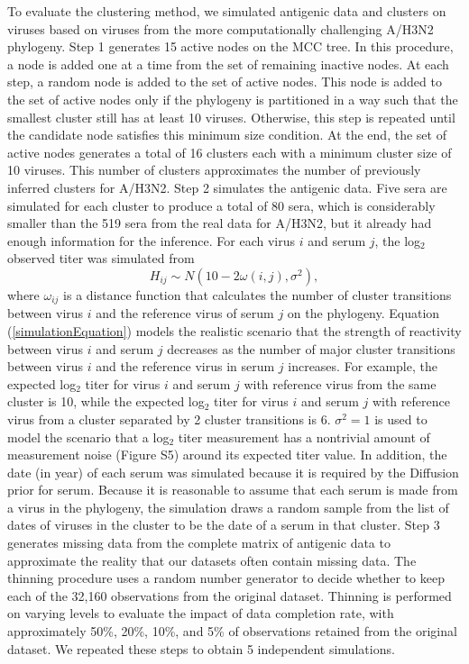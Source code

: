 \documentclass[11pt,oneside,letterpaper]{article}
\begin{document}

To evaluate the clustering method, we simulated antigenic data and clusters on viruses based on viruses from the more computationally challenging A/H3N2 phylogeny.
Step 1 generates 15 active nodes on the MCC tree. 
In this procedure, a node is added one at a time from the set of remaining inactive nodes.
At each step, a random node is added to the set of active nodes.
This node is added to the set of active nodes only if the phylogeny is partitioned in a way such that the smallest cluster still has at least 10 viruses. 
Otherwise, this step is repeated until the candidate node satisfies this minimum size condition.
At the end, the set of active nodes generates a total of 16 clusters each with a minimum cluster size of 10 viruses.
This number of clusters approximates the number of previously inferred clusters for A/H3N2\cite{smith_mapping_2004}. 
Step 2 simulates the antigenic data.
Five sera are simulated for each cluster to produce a total of 80 sera, which is considerably smaller than the 519 sera from the real data for A/H3N2, but it already had enough information for the inference.
For each virus $i$ and serum $j$, the log$_2$ observed titer was simulated from 
\begin{equation}
 \label{simulationEquation}
H_{ij} \sim N(  10 -  2 \omega(i,j) ,  \sigma^2 )     ,
\end{equation}
where $\omega_{ij}$ is a distance function that calculates the number of cluster transitions  between virus $i$ and the reference virus of serum $j$ on the phylogeny.
Equation (\ref{simulationEquation}) models the realistic scenario that the strength of reactivity between virus $i$ and serum $j$ decreases as the number of major cluster transitions between virus $i$ and the reference virus in serum $j$ increases.
For example, the expected log$_2$ titer for virus $i$ and serum $j$ with reference virus from the same cluster is 10, while the expected log$_2$ titer for virus $i$ and serum $j$ with reference virus from a cluster separated by 2 cluster transitions is 6.
$\sigma^2 = 1$ is used to model the scenario that a log$_2$ titer measurement has a nontrivial amount of measurement noise (Figure S5) around its expected titer value.
In addition, the date (in year) of each serum was simulated because it is required by the Diffusion prior for serum.
Because it is reasonable to assume that each serum is made from a virus in the phylogeny, the simulation draws a random sample from the list of dates of viruses in the cluster to be the date of a serum in that cluster.
Step 3 generates missing data from the complete matrix of antigenic data to approximate the reality that our datasets often contain missing data.
The thinning procedure uses a random number generator to decide whether to keep each of the 32,160 observations from the original dataset.
Thinning is performed on varying levels to evaluate the impact of data completion rate, with approximately 50\%, 20\%, 10\%, and 5\% of observations retained from the original dataset.
We repeated these steps to obtain 5 independent simulations.
\end{document}
